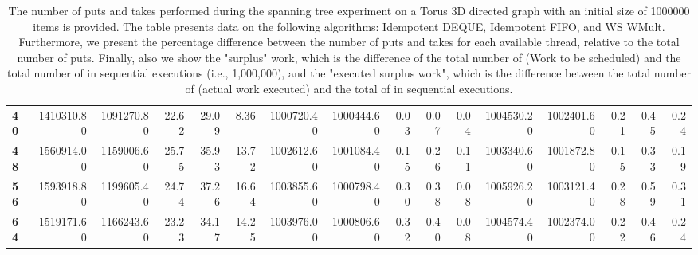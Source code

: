 \begin{table}[!ht]
{\begin{tabular}{lrrrrrrrrrrrrrrr}
\textbf{40} &       1410310.80 & 1091270.80 &          22.62 &       29.09 &                 8.36 &      1000720.40 & 1000444.60 &           0.03 &        0.07 &                 0.04 & 1004530.20 & 1002401.60 &           0.21 &        0.45 &                 0.24 \\
\textbf{48} &       1560914.00 & 1159006.60 &          25.75 &       35.93 &                13.72 &      1002612.60 & 1001084.40 &           0.15 &        0.26 &                 0.11 & 1003340.60 & 1001872.80 &           0.15 &        0.33 &                 0.19 \\
\textbf{56} &       1593918.80 & 1199605.40 &          24.74 &       37.26 &                16.64 &      1003855.60 & 1000798.40 &           0.30 &        0.38 &                 0.08 & 1005926.20 & 1003121.40 &           0.28 &        0.59 &                 0.31 \\
\textbf{64} &       1519171.60 & 1166243.60 &          23.23 &       34.17 &                14.25 &      1003976.00 & 1000806.60 &           0.32 &        0.40 &                 0.08 & 1004574.40 & 1002374.00 &           0.22 &        0.46 &                 0.24 \\
\bottomrule
\end{tabular}}
\label{difference-Torus_3D_directed-1000000-IDEMPOTENT_DEQUE-IDEMPOTENT_FIFO-WS_NC_MULT_OPT}
\caption{The number of puts and takes performed during the
    spanning tree experiment on a Torus 3D directed graph with an initial size
    of 1000000 items is provided. The table presents data on the
    following algorithms: Idempotent DEQUE, Idempotent FIFO, and
    WS WMult. Furthermore, we present the percentage difference
    between the number of puts and takes for each available thread,
    relative to the total number of puts. Finally, also we show the
    "surplus" work, which is the difference of the total number of
    \Puts (Work to be scheduled) and the total number of \Puts in
    sequential executions (i.e., 1,000,000), and the "executed surplus
    work", which is the difference between the total number of \Takes
    (actual work executed) and the total of \Takes in sequential
    executions.}
\end{table}
